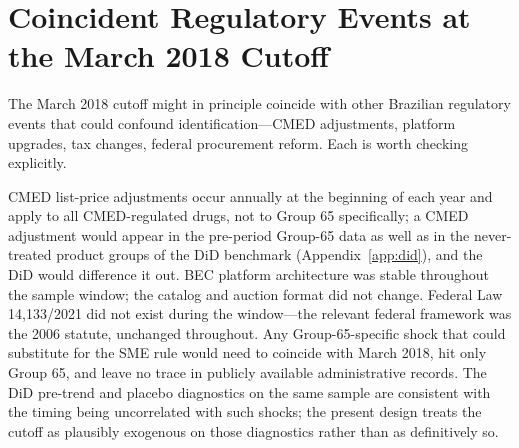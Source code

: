 \section{Coincident Regulatory Events at the March 2018 Cutoff}\label{app:cutoff}

The March 2018 cutoff might in principle coincide with other Brazilian regulatory events that could confound identification---CMED adjustments, platform upgrades, tax changes, federal procurement reform. Each is worth checking explicitly.

CMED list-price adjustments occur annually at the beginning of each year and apply to all CMED-regulated drugs, not to Group 65 specifically; a CMED adjustment would appear in the pre-period Group-65 data as well as in the never-treated product groups of the DiD benchmark (Appendix~\ref{app:did}), and the DiD would difference it out. BEC platform architecture was stable throughout the sample window; the catalog and auction format did not change. Federal Law 14{,}133/2021 did not exist during the window---the relevant federal framework was the 2006 statute, unchanged throughout. Any Group-65-specific shock that could substitute for the SME rule would need to coincide with March 2018, hit only Group 65, and leave no trace in publicly available administrative records. The DiD pre-trend and placebo diagnostics on the same sample are consistent with the timing being uncorrelated with such shocks; the present design treats the cutoff as plausibly exogenous on those diagnostics rather than as definitively so.
